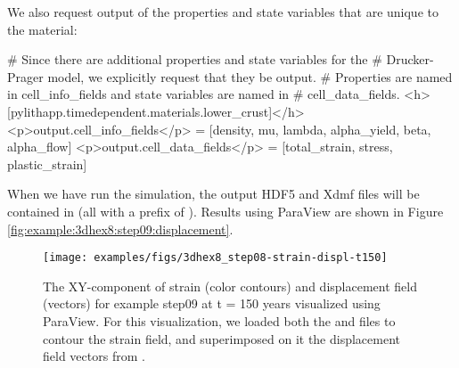 We also request output of the properties and state variables that
are unique to the  material:
\begin{cfg}
# Since there are additional properties and state variables for the
# Drucker-Prager model, we explicitly request that they be output.
# Properties are named in cell\_info\_fields and state variables are named in
# cell_data_fields.
<h>[pylithapp.timedependent.materials.lower_crust]</h>
<p>output.cell_info_fields</p> = [density, mu, lambda, alpha_yield, beta, alpha_flow]
<p>output.cell_data_fields</p> = [total_strain, stress, plastic_strain]
\end{cfg}
When we have run the simulation, the output HDF5 and Xdmf files will
be contained in  (all with a prefix
of ). Results using ParaView are shown in Figure
\vref{fig:example:3dhex8:step09:displacement}.

\begin{figure}
  \texttt{[image: examples/figs/3dhex8\_step08-strain-displ-t150]}
  \caption{The XY-component of strain (color contours) and displacement field
    (vectors) for example step09 at t = 150 years visualized using ParaView.
    For this visualization, we loaded both the 
    and  files to contour the strain field,
    and superimposed on it the displacement field vectors from .}
  \label{fig:example:3dhex8:step09:displacement}
\end{figure}

